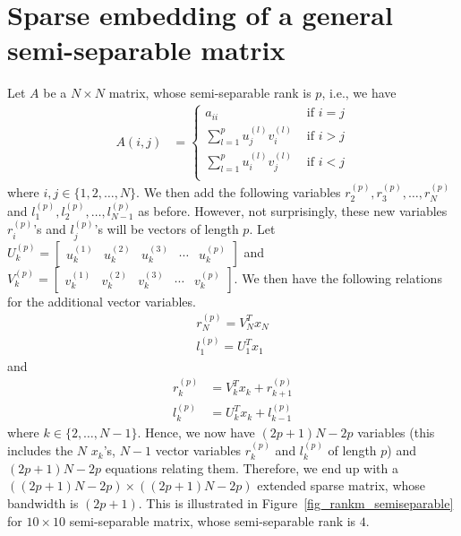\documentclass[times]{nlaauth}
\begin{document}

\section{Sparse embedding of a general semi-separable matrix}
Let $A$ be a $N \times N$ matrix, whose semi-separable rank is $p$, i.e., we have
\begin{align}
A(i,j) & =
\begin{cases}
a_{ii} & \text{ if }i=j\\
\displaystyle\sum_{l=1}^p u_j^{(l)} v_i^{(l)} & \text{ if }i>j\\
\displaystyle\sum_{l=1}^p u_i^{(l)} v_j^{(l)} & \text{ if }i<j\\
\end{cases}
\end{align}
where $i,j \in \{1,2,\ldots,N\}$. We then add the following variables $r_2^{(p)},r_3^{(p)},\ldots,r_N^{(p)}$ and $l_1^{(p)},l_2^{(p)},\ldots,l_{N-1}^{(p)}$ as before. However, not surprisingly, these new variables $r_i^{(p)}$'s and $l_j^{(p)}$'s will be vectors of length $p$. Let $U_k^{(p)} = \begin{bmatrix} u_k^{(1)} & u_k^{(2)} & u_k^{(3)} & \cdots & u_k^{(p)}\end{bmatrix}$ and $V_k^{(p)} = \begin{bmatrix} v_k^{(1)} & v_k^{(2)} & v_k^{(3)} & \cdots & v_k^{(p)}\end{bmatrix}$. We then have the following relations for the additional vector variables.
\begin{align}
r_N^{(p)} = V_N^Tx_N\\
l_1^{(p)} = U_1^Tx_1
\end{align} and
\begin{align}
r_k^{(p)} & = V_k^T x_k + r_{k+1}^{(p)}\\
l_k^{(p)} & = U_k^T x_k + l_{k-1}^{(p)}
\end{align}
where $k \in \{2,\ldots,N-1\}$. Hence, we now have $(2p+1)N-2p$ variables (this includes the $N$ $x_k$'s, $N-1$ vector variables $r_k^{(p)}$ and $l_k^{(p)}$ of length $p$) and $(2p+1)N-2p$ equations relating them. Therefore, we end up with a $((2p+1)N-2p) \times ((2p+1)N-2p)$ extended sparse matrix, whose bandwidth is $(2p+1)$. This is illustrated in Figure~\ref{fig_rankm_semiseparable} for $10 \times 10$ semi-separable matrix, whose semi-separable rank is $4$.
\end{document}
